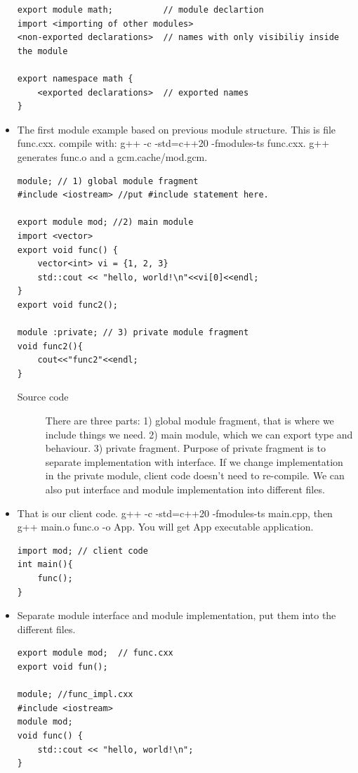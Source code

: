 \documentclass[a4paper,11pt,twoside]{book}
\begin{document}
\begin{itemize}
\begin{lstlisting}
export module math;          // module declartion 
import <importing of other modules> 
<non-exported declarations>  // names with only visibiliy inside the module

export namespace math {
	<exported declarations>  // exported names 
}	
\end{lstlisting}	
	
	
    \item The first module example based on previous module structure. This is file func.cxx. compile with: g++ -c -std=c++20 -fmodules-ts func.cxx. g++ generates func.o and a gcm.cache/mod.gcm.
\begin{lstlisting}
module; // 1) global module fragment
#include <iostream> //put #include statement here.

export module mod; //2) main module
import <vector>    
export void func() {
	vector<int> vi = {1, 2, 3}
    std::cout << "hello, world!\n"<<vi[0]<<endl;
}
export void func2();

module :private; // 3) private module fragment
void func2(){
	cout<<"func2"<<endl;
}
\end{lstlisting}
\begin{description}
    \item[Source code] There are three parts: 1) global module fragment, that is where we include things we need. 2) main module, which we can export type and behaviour. 3) private fragment. Purpose of private fragment is to separate implementation with interface. If we change implementation in the private module, client code doesn't need to re-compile. We can also put interface and module implementation into different files. 
    
\end{description}

	\item That is our client code. g++ -c -std=c++20 -fmodules-ts main.cpp, then g++ main.o func.o -o App. You will get App executable application.
\begin{lstlisting}
import mod; // client code 
int main(){
    func();
}
\end{lstlisting}

    \item Separate module interface and module implementation, put them into the different files. 
\begin{lstlisting}
export module mod;  // func.cxx
export void fun();

module; //func_impl.cxx
#include <iostream>
module mod;
void func() {
    std::cout << "hello, world!\n";
}


\end{lstlisting}
\end{itemize}
\end{document}
